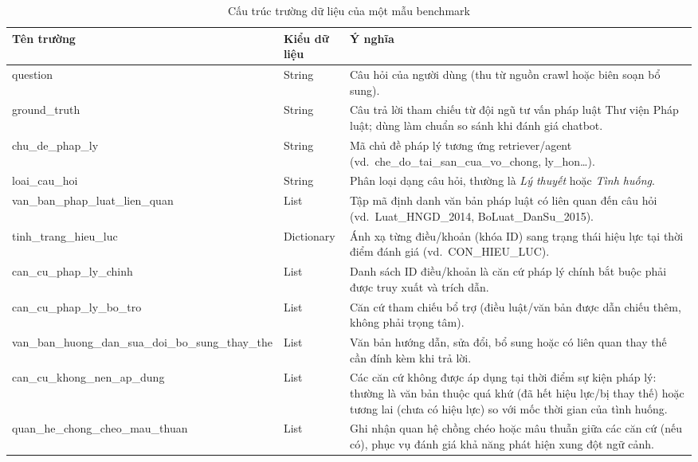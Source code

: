 \documentclass[../DoAn.tex]{subfiles}
\begin{document}
\begin{table}[H]
\centering
\caption{Cấu trúc trường dữ liệu của một mẫu benchmark}
\label{tab:benchmark_schema}
\begin{tabular}{|p{4.5cm}|p{2.5cm}|p{7.5cm}|}
\hline
\textbf{Tên trường} & \textbf{Kiểu dữ liệu} & \textbf{Ý nghĩa} \\
\hline
question & String & Câu hỏi của người dùng (thu từ nguồn crawl hoặc biên soạn bổ sung). \\
\hline
ground\_\allowbreak truth & String & Câu trả lời tham chiếu từ đội ngũ tư vấn pháp luật Thư viện Pháp luật; dùng làm chuẩn so sánh khi đánh giá chatbot. \\
\hline
chu\_\allowbreak de\_\allowbreak phap\_\allowbreak ly & String & Mã chủ đề pháp lý tương ứng retriever/agent (vd.\ che\_do\_tai\_san\_cua\_vo\_chong, ly\_hon\ldots). \\
\hline
loai\_\allowbreak cau\_\allowbreak hoi & String & Phân loại dạng câu hỏi, thường là \textit{Lý thuyết} hoặc \textit{Tình huống}. \\
\hline
van\_\allowbreak ban\_\allowbreak phap\_\allowbreak luat\_\allowbreak lien\_\allowbreak quan & List & Tập mã định danh văn bản pháp luật có liên quan đến câu hỏi (vd.\ Luat\_HNGD\_2014, BoLuat\_DanSu\_2015). \\
\hline
tinh\_\allowbreak trang\_\allowbreak hieu\_\allowbreak luc & Dictionary & Ánh xạ từng điều/khoản (khóa ID) sang trạng thái hiệu lực tại thời điểm đánh giá (vd.\ CON\_HIEU\_LUC). \\
\hline
can\_\allowbreak cu\_\allowbreak phap\_\allowbreak ly\_\allowbreak chinh & List & Danh sách ID điều/khoản là căn cứ pháp lý chính bắt buộc phải được truy xuất và trích dẫn. \\
\hline
can\_\allowbreak cu\_\allowbreak phap\_\allowbreak ly\_\allowbreak bo\_\allowbreak tro & List & Căn cứ tham chiếu bổ trợ (điều luật/văn bản được dẫn chiếu thêm, không phải trọng tâm). \\
\hline
van\_\allowbreak ban\_\allowbreak huong\_\allowbreak dan\_\allowbreak sua\_\allowbreak doi\_\allowbreak bo\_\allowbreak sung\_\allowbreak thay\_\allowbreak the & List & Văn bản hướng dẫn, sửa đổi, bổ sung hoặc có liên quan thay thế cần đính kèm khi trả lời. \\
\hline
can\_\allowbreak cu\_\allowbreak khong\_\allowbreak nen\_\allowbreak ap\_\allowbreak dung & List & Các căn cứ không được áp dụng tại thời điểm sự kiện pháp lý: thường là văn bản thuộc quá khứ (đã hết hiệu lực/bị thay thế) hoặc tương lai (chưa có hiệu lực) so với mốc thời gian của tình huống. \\
\hline
quan\_\allowbreak he\_\allowbreak chong\_\allowbreak cheo\_\allowbreak mau\_\allowbreak thuan & List & Ghi nhận quan hệ chồng chéo hoặc mâu thuẫn giữa các căn cứ (nếu có), phục vụ đánh giá khả năng phát hiện xung đột ngữ cảnh. \\
\hline
\end{tabular}
\end{table}
\end{document}
